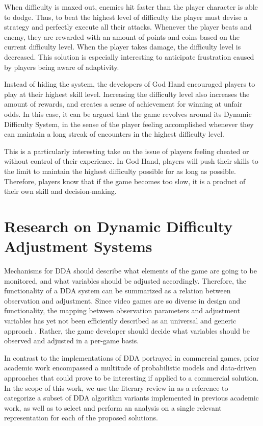 \documentclass[cic,tc,english]{iiufrgs}
\begin{document}
When difficulty is maxed out, enemies hit faster than the player character is able to dodge. Thus, to beat the highest level of difficulty the player must devise a strategy and perfectly execute all their attacks. Whenever the player beats and enemy, they are rewarded with an amount of points and coins based on the current difficulty level. When the player takes damage, the difficulty level is decreased. This solution is especially interesting to anticipate frustration caused by players being aware of adaptivity. 

Instead of hiding the system, the developers of God Hand encouraged players to play at their highest skill level. Increasing the difficulty level also increases the amount of rewards, and creates a sense of achievement for winning at unfair odds. In this case, it can be argued that the game revolves around its Dynamic Difficulty System, in the sense of the player feeling accomplished whenever they can maintain a long streak of encounters in the highest difficulty level. 

This is a particularly interesting take on the issue of players feeling cheated or without control of their experience. In God Hand, players will push their skills to the limit to maintain the highest difficulty possible for as long as possible. Therefore, players know that if the game becomes too slow, it is a product of their own skill and decision-making.

\section{Research on Dynamic Difficulty Adjustment Systems}

Mechanisms for DDA should describe what elements of the game are going to be monitored, and what variables should be adjusted accordingly. Therefore, the functionality of a DDA system can be summarized as a relation between observation and adjustment. Since video games are so diverse in design and functionality, the mapping between observation parameters and adjustment variables has yet not been efficiently described as an universal and generic approach \cite{PHD_DynamicDifficultyAdjustment}. Rather, the game developer should decide what variables should be observed and adjusted in a per-game basis.

In contrast to the implementations of DDA portrayed in commercial games, prior academic work encompassed a multitude of probabilistic models and data-driven approaches that could prove to be interesting if applied to a commercial solution. In the scope of this work, we use the literary review in \cite{article_ddareview} as a reference to categorize a subset of DDA algorithm variants implemented in previous academic work, as well as to select and perform an analysis on a single relevant representation for each of the proposed solutions.
\end{document}
